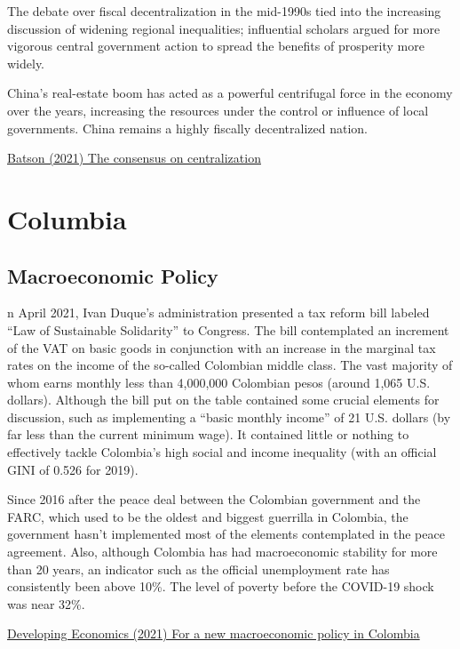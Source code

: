\documentclass[
]{book}
\begin{document}
The debate over fiscal decentralization in the mid-1990s tied into the increasing discussion of widening regional inequalities; influential scholars argued for more vigorous central government action to spread the benefits of prosperity more widely.

China's real-estate boom has acted as a powerful centrifugal force in the economy over the years, increasing the resources under the control or influence of local governments.
China remains a highly fiscally decentralized nation.

\href{https://andrewbatson.com/2021/11/29/the-consensus-on-centralization/}{Batson (2021) The consensus on centralization}

\hypertarget{columbia}{%
\chapter{Columbia}\label{columbia}}

\hypertarget{macroeconomic-policy}{%
\section{Macroeconomic Policy}\label{macroeconomic-policy}}

n April 2021, Ivan Duque's administration presented a tax reform bill labeled ``Law of Sustainable Solidarity'' to Congress. The bill contemplated an increment of the VAT on basic goods in conjunction with an increase in the marginal tax rates on the income of the so-called Colombian middle class. The vast majority of whom earns monthly less than 4,000,000 Colombian pesos (around 1,065 U.S. dollars). Although the bill put on the table contained some crucial elements for discussion, such as implementing a ``basic monthly income'' of 21 U.S. dollars (by far less than the current minimum wage). It contained little or nothing to effectively tackle Colombia's high social and income inequality (with an official GINI of 0.526 for 2019).

Since 2016 after the peace deal between the Colombian government and the FARC, which used to be the oldest and biggest guerrilla in Colombia, the government hasn't implemented most of the elements contemplated in the peace agreement. Also, although Colombia has had macroeconomic stability for more than 20 years, an indicator such as the official unemployment rate has consistently been above 10\%. The level of poverty before the COVID-19 shock was near 32\%.

\href{https://developingeconomics.org/2021/05/21/for-a-new-macroeconomic-policy-in-colombia/}{Developing Economics (2021) For a new macroeconomic policy in Colombia}
\end{document}
